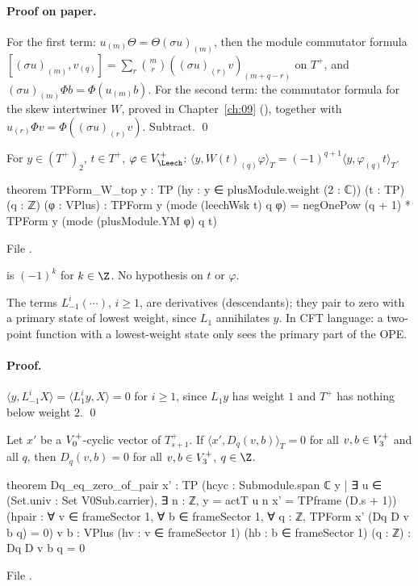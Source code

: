 \paragraph{Proof on paper.}  For the first term: $u_{(m)}\Theta=\Theta(\sigma u)_{(m)}$, then the module
commutator formula $[(\sigma u)_{(m)},v_{(q)}]=\sum_r\binom mr((\sigma u)_{(r)}v)_{(m+q-r)}$ on $T^+$, and
$(\sigma u)_{(m)}\Phi b=\Phi(u_{(m)}b)$.  For the second term: the commutator formula for the skew
intertwiner $W$, proved in Chapter~\ref{ch:09} (), together with
$u_{(r)}\Phi v=\Phi((\sigma u)_{(r)}v)$.  Subtract. \qed

\begin{lemma}[Only the $i=0$ term of $W$ survives against weight 2]\label{ch14:lem:Wtop}
For $y\in(T^+)_2$, $t\in T^+$, $\varphi\in V_\Leech^+$:
$\langle y,W(t)_{(q)}\varphi\rangle_T=(-1)^{q+1}\langle y,\varphi_{(q)}t\rangle_T$.
\end{lemma}
\begin{leancode}
theorem TPForm_W_top {y : TP} (hy : y ∈ plusModule.weight (2 : ℂ)) (t : TP) (q : ℤ) (φ : VPlus) :
    TPForm y (mode (leechWsk t) q φ) = negOnePow (q + 1) * TPForm y (mode (plusModule.YM φ) q t)
\end{leancode}
File .

\begin{dictionary}
 is $(-1)^k$ for $k\in\Z$.  No hypothesis on $t$ or $\varphi$.
\end{dictionary}

\begin{physics}
The terms $L_{-1}^i(\cdots)$, $i\ge1$, are derivatives (descendants); they pair to zero with a
primary state of lowest weight, since $L_1$ annihilates $y$.  In CFT language: a two-point function
with a lowest-weight state only sees the primary part of the OPE.
\end{physics}

\paragraph{Proof.}  $\langle y,L_{-1}^iX\rangle=\langle L_1^iy,X\rangle=0$ for $i\ge1$, since $L_1y$ has weight $1$
and $T^+$ has nothing below weight $2$. \qed

\begin{theorem}\label{ch14:thm:li}
Let $x'$ be a $V_0^{+}$-cyclic vector of $T_{s+1}^+$.  If $\langle x',D_q(v,b)\rangle_T=0$ for all
$v,b\in V_3^{+}$ and all $q$, then $D_q(v,b)=0$ for all $v,b\in V_3^{+}$, $q\in\Z$.
\end{theorem}
\begin{leancode}
theorem Dq_eq_zero_of_pair {x' : TP}
    (hcyc : Submodule.span ℂ {y | ∃ u ∈ (Set.univ : Set V0Sub.carrier), ∃ n : ℤ, y = actT u n x'}
      = TPframe (D.s + 1))
    (hpair : ∀ v ∈ frameSector 1, ∀ b ∈ frameSector 1, ∀ q : ℤ, TPForm x' (Dq D v b q) = 0)
    {v b : VPlus} (hv : v ∈ frameSector 1) (hb : b ∈ frameSector 1) (q : ℤ) : Dq D v b q = 0
\end{leancode}
File .

